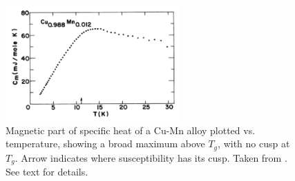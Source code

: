 \begin{figure}
  \centering
  \includegraphics[width=0.6\textwidth]{img/cv.png}
\caption{\label{fig:cu-mn-cv}Magnetic part of specific heat of a Cu-Mn alloy 
plotted vs. temperature, showing a broad maximum above $T_g$, with no cusp at $T_g$. 
Arrow indicates where susceptibility has its cusp. Taken from \citet{PhysRevB.13.4053}.
See text for details.
}
\end{figure}

  

